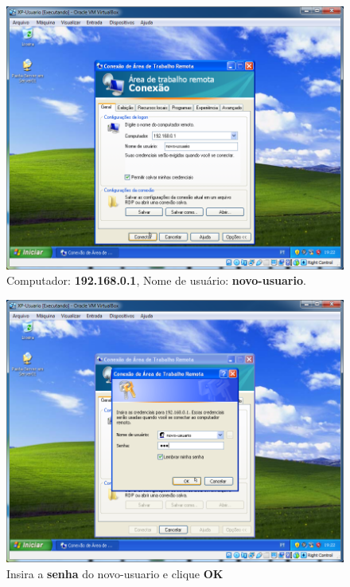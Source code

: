 \documentclass[10pt]{article}
\begin{document}
\begin{figure}[H]
    \centering
    \caption{Computador: \textbf{192.168.0.1}, Nome de usuário: \textbf{novo-usuario}.}
    \label{fig:ar023}
    \includegraphics[width=\linewidth]{images/acesso_remoto/ar023.png}
\end{figure}
\begin{figure}[H]
    \centering
    \caption{Insira a \textbf{senha} do novo-usuario e clique \textbf{OK}}
    \label{fig:ar024}
    \includegraphics[width=\linewidth]{images/acesso_remoto/ar024.png}
\end{figure}
\end{document}
